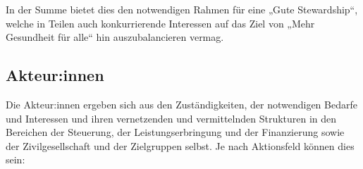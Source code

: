 \documentclass{article}
\begin{document}
In der Summe bietet dies den notwendigen Rahmen für eine „Gute Stewardship“, welche in Teilen auch konkurrierende Interessen auf das Ziel von „Mehr Gesundheit für alle“ hin auszubalancieren vermag.


\subsection{Akteur:innen}\label{H5960220}



Die Akteur:innen ergeben sich aus den Zuständigkeiten, der notwendigen Bedarfe und Interessen und ihren vernetzenden und vermittelnden Strukturen in den Bereichen der Steuerung, der Leistungserbringung und der Finanzierung sowie der Zivilgesellschaft und der Zielgruppen selbst. Je nach Aktionsfeld können dies sein:
\end{document}
